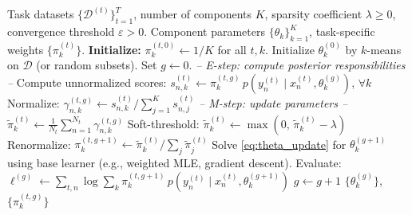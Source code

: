 \documentclass[preprint,12pt]{elsarticle}
\begin{document}
	\begin{algorithm}[t]
		\caption{EM-Based Multi-Task Component Combination (EM-MTL)}
		\label{alg:em_mtl}
		\begin{algorithmic}[1]
			\REQUIRE Task datasets $\{\mathcal{D}^{(t)}\}_{t=1}^T$,
			number of components $K$,
			sparsity coefficient $\lambda \ge 0$,
			convergence threshold $\varepsilon > 0$.
			\ENSURE  Component parameters $\{\theta_k\}_{k=1}^K$,
			task-specific weights $\{\pi_k^{(t)}\}$.
			\STATE \textbf{Initialize:}
			$\pi_k^{(t,0)} \leftarrow 1/K$ for all $t,k$.
			Initialize $\theta_k^{(0)}$ by
			$k$-means on $\mathcal{D}$ (or random subsets).
			Set $g \leftarrow 0$.
			\REPEAT
			\STATE \textit{-- E-step: compute posterior responsibilities --}
			\STATE Compute unnormalized scores:
			$s_{n,k}^{(t)} \leftarrow
			\pi_k^{(t,g)}\,
			p(y_n^{(t)}\mid x_n^{(t)},\theta_k^{(g)})$,
			$\forall k$
			\STATE Normalize: $\gamma_{n,k}^{(t,g)} \leftarrow
			s_{n,k}^{(t)} / \sum_{j=1}^K s_{n,j}^{(t)}$
			\ENDFOR
			\ENDFOR
			\STATE \textit{-- M-step: update parameters --}
			\STATE $\tilde{\pi}_k^{(t)} \leftarrow
			\frac{1}{N_t}\sum_{n=1}^{N_t}\gamma_{n,k}^{(t,g)}$
			\STATE Soft-threshold:
			$\tilde{\pi}_k^{(t)} \leftarrow
			\max(0,\, \tilde{\pi}_k^{(t)} - \lambda)$
			\ENDIF
			\ENDFOR
			\STATE Renormalize:
			$\pi_k^{(t,g+1)} \leftarrow
			\tilde{\pi}_k^{(t)} /
			\sum_{j}\tilde{\pi}_j^{(t)}$
			\ENDFOR
			\STATE Solve \eqref{eq:theta_update} for
			$\theta_k^{(g+1)}$ using base learner
			(e.g., weighted MLE, gradient descent).
			\ENDFOR
			\STATE Evaluate:
			$\ell^{(g)} \leftarrow
			\sum_{t,n}\log\sum_k
			\pi_k^{(t,g+1)}\,p(y_n^{(t)}\mid x_n^{(t)},\theta_k^{(g+1)})$
			\STATE $g \leftarrow g + 1$
			\RETURN $\{\theta_k^{(g)}\}$, $\{\pi_k^{(t,g)}\}$
		\end{algorithmic}
	\end{algorithm}
	
\end{document}
